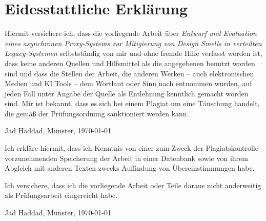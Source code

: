 \chapter*{Eidesstattliche Erklärung}


Hiermit versichere ich, dass die vorliegende Arbeit über \textit{Entwurf und Evaluation eines asynchronen Proxy-Systems zur Mitigierung von Design Smells in verteilten Legacy-Systemen} selbstständig von mir und ohne fremde Hilfe verfasst worden ist, dass keine anderen Quellen und Hilfsmittel als die angegebenen benutzt worden sind und dass die Stellen der Arbeit, die anderen Werken -- auch elektronischen Medien und KI Tools -- dem Wortlaut oder Sinn nach entnommen wurden, auf jeden Fall unter Angabe der Quelle als Entlehnung kenntlich gemacht worden sind. Mir ist bekannt, dass es sich bei einem Plagiat um eine Täuschung handelt, die gemäß der Prüfungsordnung sanktioniert werden kann.

\vspace{1cm}

\noindent \parbox{20em}{\hrulefill}

\noindent Jad Haddad, Münster, \today

\vspace{1cm}

\noindent Ich erkläre hiermit, dass ich Kenntnis von einer zum Zweck der Plagiatskontrolle vorzunehmenden Speicherung der Arbeit in einer Datenbank sowie von ihrem Abgleich mit anderen Texten zwecks Auffindung von Übereinstimmungen habe.
\vspace{1em}

\noindent Ich versichere, dass ich die vorliegende Arbeit oder Teile daraus nicht anderweitig als Prüfungsarbeit eingereicht habe.

\vspace{1cm}

\noindent \parbox{20em}{\hrulefill}

\noindent Jad Haddad, Münster, \today